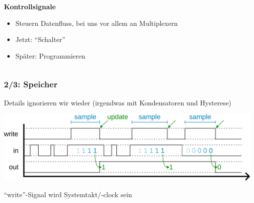 \documentclass[t,aspectratio=169,usenames,dvipsnames]{beamer}
\begin{document}
\begin{frame}
\begin{columns}[T]
\begin{column}{.45\textwidth}
      \bigskip

      \textbf{Kontrollsignale}

      \begin{itemize}
      \item Steuern Datenfluss, bei uns vor allem an Multiplexern
      \item Jetzt: \enquote{Schalter}
      \item Später: Programmieren
      \end{itemize}

      \bigskip

  \end{column}
  \end{columns}
\end{frame}

\begin{frame}
  \frametitle{2/3: Speicher}

  Details ignorieren wir wieder (irgendwas mit Kondensatoren und Hysterese)

  \bigskip

  \includegraphics[width=\linewidth]{reg-waveform.pdf}

  \bigskip

  \enquote{write}-Signal wird Systemtakt/-clock sein
\end{frame}
\end{document}
